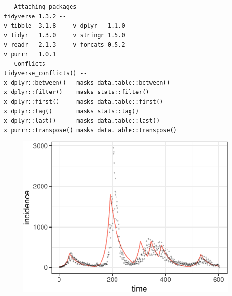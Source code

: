 \documentclass[
  11pt,
  letterpaper,
  DIV=11,
  numbers=noendperiod]{scrartcl}
\begin{document}
\begin{verbatim}
-- Attaching packages --------------------------------------- tidyverse 1.3.2 --
v tibble  3.1.8     v dplyr   1.1.0
v tidyr   1.3.0     v stringr 1.5.0
v readr   2.1.3     v forcats 0.5.2
v purrr   1.0.1     
-- Conflicts ------------------------------------------ tidyverse_conflicts() --
x dplyr::between()   masks data.table::between()
x dplyr::filter()    masks stats::filter()
x dplyr::first()     masks data.table::first()
x dplyr::lag()       masks stats::lag()
x dplyr::last()      masks data.table::last()
x purrr::transpose() masks data.table::transpose()
\end{verbatim}

\begin{figure}

{\centering \includegraphics{progress_files/figure-pdf/unnamed-chunk-4-1.pdf}

}

\end{figure}
\end{document}
